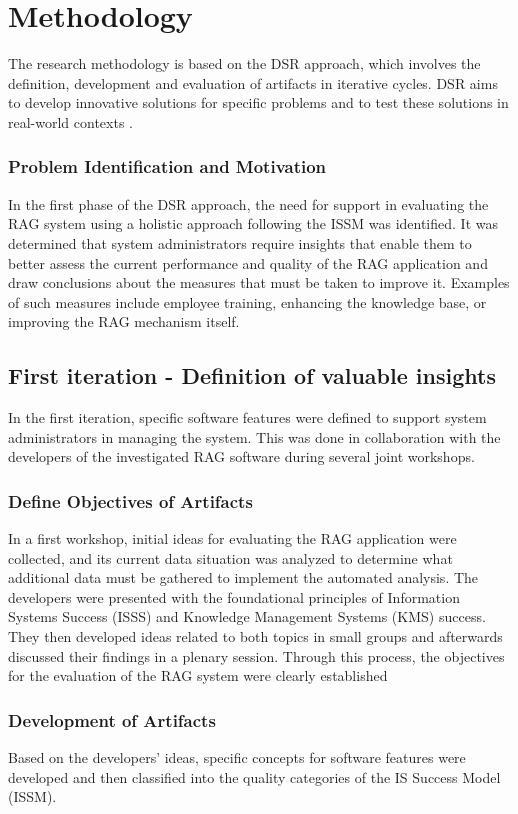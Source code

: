 \documentclass[
	english,
	ruledheaders=section,%
	class=report,%
	thesis={type=bachelor},%
	accentcolor=1b,%
	custommargins=true,%
	marginpar=false,%
	parskip=half-,%
	fontsize=11pt,%
	DIV=14,
]{tudapub}
\begin{document}
\chapter{Methodology}
The research methodology is based on the DSR approach, which involves the definition, development and evaluation of artifacts in iterative cycles. DSR aims to develop innovative solutions for specific problems and to test these solutions in real-world contexts \parencite{Peffers2007}.\\
\subsection{Problem Identification and Motivation}
In the first phase of the DSR approach, the need for support in evaluating the RAG system using a holistic approach following the ISSM was identified. It was determined that system administrators require insights that enable them to better assess the current performance and quality of the RAG application and draw conclusions about the measures that must be taken to improve it. Examples of such measures include employee training, enhancing the knowledge base, or improving the RAG mechanism itself.
\section{First iteration - Definition of valuable insights}
In the first iteration, specific software features were defined to support system administrators in managing the system. This was done in collaboration with the developers of the investigated RAG software during several joint workshops.
\subsection{Define Objectives of Artifacts}
In a first workshop, initial ideas for evaluating the RAG application were collected, and its current data situation was analyzed to determine what additional data must be gathered to implement the automated analysis. The developers were presented with the foundational principles of Information Systems Success (ISSS) and Knowledge Management Systems (KMS) success. They then developed ideas related to both topics in small groups and afterwards discussed their findings in a plenary session. Through this process, the objectives for the evaluation of the RAG system were clearly established
\subsection{Development of Artifacts}
Based on the developers' ideas, specific concepts for software features were developed and then classified into the quality categories of the IS Success Model (ISSM).
\end{document}

